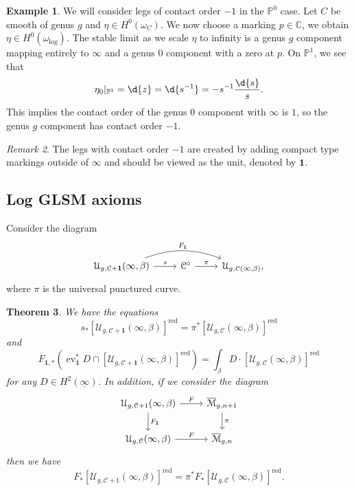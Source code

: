 \documentclass[10pt]{amsart}
\newtheorem{thm}{Theorem}[section]
\theoremstyle{definition}
\newtheorem{exm}[thm]{Example}
\theoremstyle{remark}
\newtheorem{rmk}[thm]{Remark}
\theoremstyle{plain}
\theoremstyle{definition}
\theoremstyle{remark}
\newcommand{\C}{\mathbb{C}}
\renewcommand{\P}{\mathbb{P}}
\newcommand{\Mbar}{\overline{\mathcal{M}}}
\newcommand{\mc}[1]{\mathcal{#1}}
\newcommand{\on}[1]{\operatorname{#1}}
\newcommand{\ul}[1]{\underline{#1}}
\newcommand{\1}{\mathbf{1}}
\newcommand{\2}{\mathbf{2}}
\newcommand{\3}{\mathbf{3}}
\DeclareMathOperator{\ev}{ev}
\begin{document}
\begin{exm}
    We will consider legs of contact order $-1$ in the $\P^0$ case. Let $C$ be smooth of genus $g$ and $\eta \in H^0(\omega_C)$. We now choose a marking $p \in \C$, we obtain $\eta \in H^0(\omega_{\log})$. The stable limit as we scale $\eta$ to infinity is a genus $g$ component mapping entirely to $\infty$ and a genus $0$ component with a zero at $p$. On $\P^1$, we see that
    \[ \eta_0|_{\P^1} = \d{z} = \d{s^{-1}} = -s^{-1} \frac{\d{s}}{s}. \]
    This implies the contact order of the genus $0$ component with $\infty$ is $1$, so the genus $g$ component has contact order $-1$.
\end{exm}

\begin{rmk}
    The legs with contact order $-1$ are created by adding compact type markings outside of $\infty$ and should be viewed as the unit, denoted by $\1$.
\end{rmk}

\subsection{Log GLSM axioms}%
\label{sub:Log GLSM axioms}

Consider the diagram
\begin{equation*}
\begin{tikzcd}
    \mc{U}_{g, \mc{C}+\1}(\infty, \beta) \ar{r}{s} \ar[bend left=20]{rr}{F_{\1}} & \mc{C}^{\circ} \ar{r}{\pi} & \mc{U}_{g, \mc{C}(\infty, \beta)},
\end{tikzcd}
\end{equation*}
where $\pi$ is the universal punctured curve.

\begin{thm}
    We have the equations
    \[ s_* [\mc{U}_{g, \mc{C}+\1}(\infty, \beta)]^{\on{red}} = \pi^* [\mc{U}_{g, \mc{C}}(\infty, \beta)]^{\on{red}} \]
    and 
    \[ F_{\1, *} (\ev_{\1}^* D \cap [\mc{U}_{g, \mc{C}+\1}(\infty, \beta)]^{\on{red}}) = \int_{\beta} D \cdot [\mc{U}_{g, \mc{C}}(\infty, \beta)]^{\on{red}} \]
    for any $D \in H^2(\ul{\infty})$. In addition, if we consider the diagram
    \begin{equation*}
    \begin{tikzcd}
        \mc{U}_{g, \mc{C}+1}(\infty, \beta) \ar{r}{F} \ar{d}{F_{\1}} & \Mbar_{g,n+1} \ar{d}{\pi} \\
        \mc{U}_{g, \mc{C}}(\infty,\beta) \ar{r}{F} & \Mbar_{g,n}
    \end{tikzcd}
    \end{equation*}
    then we have
    \[ F_* [\mc{U}_{g,\mc{C}+1}(\infty, \beta)]^{\on{red}}= \pi^* F_*[\mc{U}_{g, \mc{C}}(\infty, \beta)]^{\on{red}}. \]
\end{thm}
\end{document}
